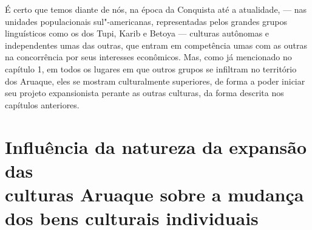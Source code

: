 É certo que temos diante de nós, na época da Conquista até a atualidade,
--- nas unidades populacionais sul"-americanas, representadas pelos
grandes grupos linguísticos como os dos Tupi, Karib e Betoya --- culturas
autônomas e independentes umas das outras, que entram em competência
umas com as outras na concorrência por seus interesses econômicos. Mas,
como já mencionado no capítulo 1, em todos os lugares em que outros
grupos se infiltram no território dos Aruaque, eles se mostram
culturalmente superiores, de forma a poder iniciar seu projeto
expansionista perante as outras culturas, da forma descrita nos
capítulos anteriores.


\chapter[Influência da natureza da expansão das culturas Aruaque\\ sobre a mudança dos bens culturais individuais]{Influência da natureza da expansão das\\ culturas Aruaque sobre a mudança\\ dos bens culturais individuais}

